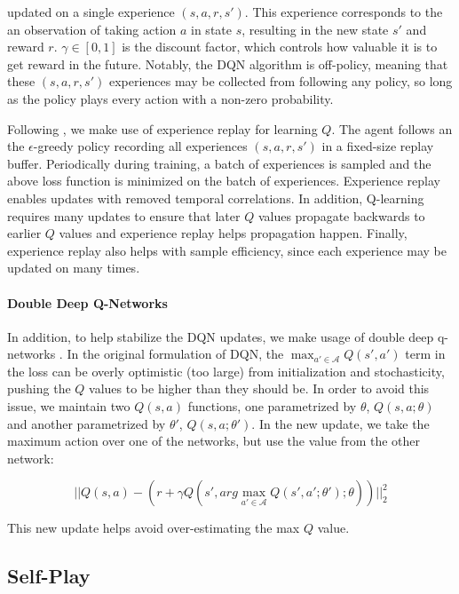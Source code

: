 \documentclass[10pt,twocolumn,letterpaper]{article}
\begin{document}
\noindent updated on a single experience $(s, a, r, s')$. This experience
corresponds to the an observation of taking action $a$ in state $s$, resulting
in the new state $s'$ and reward $r$. $\gamma \in [0, 1]$ is the discount
factor, which controls how valuable it is to get reward in the future.
Notably, the DQN algorithm is off-policy, meaning that these $(s, a, r, s')$
experiences may be collected from following any policy, so long as the policy
plays every action with a non-zero probability.

Following \citep{nature2013}, we make use of experience replay for learning $Q$. The
agent follows an the $\epsilon$-greedy policy recording all experiences $(s, a,
r, s')$ in a fixed-size replay buffer. Periodically during training, a batch
of experiences is sampled and the above loss function is minimized on the
batch of experiences. Experience replay enables updates with
removed temporal correlations. In addition, Q-learning requires many updates
to ensure that later $Q$ values propagate backwards to earlier $Q$ values and
experience replay helps propagation happen. Finally, experience replay also
helps with sample efficiency, since each experience may be updated on many
times.

\paragraph{Double Deep Q-Networks}
In addition, to help stabilize the DQN updates, we make usage of double deep
q-networks \citep{doubleDQN}. In the original formulation of DQN, the
$\max_{a' \in \mathcal{A}}Q(s', a')$ term in the loss can be overly optimistic
(too large) from initialization and stochasticity, pushing the $Q$ values to
be higher than they should be. In order to avoid this issue, we maintain two
$Q(s, a)$ functions, one parametrized by $\theta$, $Q(s, a; \theta)$ and
another parametrized by $\theta'$, $Q(s, a; \theta')$. In the new update, we
take the maximum action over one of the networks, but use the value from the
other network:

\begin{equation}
  ||Q(s, a) - (r + \gamma Q(s', arg\max_{a' \in \mathcal{A}}Q(s', a'; \theta'); \theta))||^2_2
\end{equation}

\noindent This new update helps avoid over-estimating the max $Q$ value.

\subsection{Self-Play}
\end{document}
